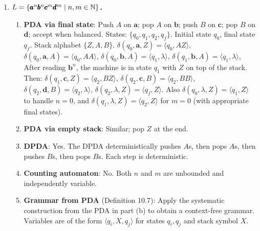 \begin{enumerate}[{10.}1. ]
Concretely: a one-state PDA accepting $\pmb{ab}$ would need a stack-based mechanism that is so constrained that it either accepts more strings or fails to properly isolate $\pmb{ab}$. For instance, $\{\pmb{a}\}$ cannot be recognized by a one-state PDA since the PDA cannot simultaneously block $\pmb{aa}$ while accepting $\pmb{a}$.

A standard example: $\{\pmb{ab},\pmb{ba}\}$ --- a two-element language where the ordering of symbols varies. A one-state PDA cannot distinguish between them without nontrivial stack interaction, which forces acceptance of additional strings.

\item \textbf{$L=\{\pmb{a}^n\pmb{b}^n\pmb{c}^m\pmb{d}^m \mid n,m\in\mathbb{N}\}$.}

\begin{enumerate}
\item \textbf{PDA via final state}: Push $A$ on $\pmb{a}$; pop $A$ on $\pmb{b}$; push $B$ on $\pmb{c}$; pop $B$ on $\pmb{d}$; accept when balanced.
States: $\{q_0,q_1,q_2,q_f\}$. Initial state $q_0$, final state $q_f$. Stack alphabet $\{Z,A,B\}$.
$\delta(q_0,\pmb{a},Z)=\langle q_0,AZ\rangle$, $\delta(q_0,\pmb{a},A)=\langle q_0,AA\rangle$,
$\delta(q_0,\pmb{b},A)=\langle q_1,\lambda\rangle$, $\delta(q_1,\pmb{b},A)=\langle q_1,\lambda\rangle$,
After reading $\pmb{b}^n$, the machine is in state $q_1$ with $Z$ on top of the stack. Then:
$\delta(q_1,\pmb{c},Z)=\langle q_2,BZ\rangle$, $\delta(q_2,\pmb{c},B)=\langle q_2,BB\rangle$,
$\delta(q_2,\pmb{d},B)=\langle q_2,\lambda\rangle$, $\delta(q_2,\lambda,Z)=\langle q_f,Z\rangle$.
Also $\delta(q_0,\lambda,Z)=\langle q_1,Z\rangle$ to handle $n=0$, and $\delta(q_1,\lambda,Z)=\langle q_2,Z\rangle$ for $m=0$ (with appropriate final states).

\item \textbf{PDA via empty stack}: Similar; pop $Z$ at the end.

\item \textbf{DPDA}: Yes. The DPDA deterministically pushes $A$s, then pops $A$s, then pushes $B$s, then pops $B$s. Each step is deterministic.

\item \textbf{Counting automaton}: No. Both $n$ and $m$ are unbounded and independently variable.

\item \textbf{Grammar from PDA} (Definition 10.7): Apply the systematic construction from the PDA in part (b) to obtain a context-free grammar. Variables are of the form $\langle q_i, X, q_j\rangle$ for states $q_i,q_j$ and stack symbol $X$.
\end{enumerate}


\end{enumerate}
